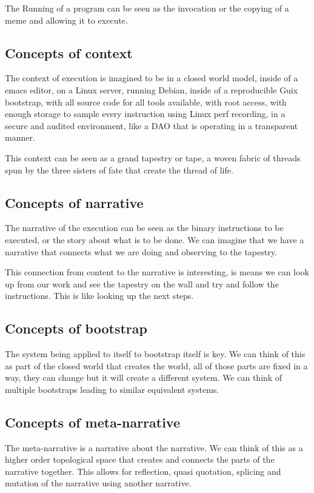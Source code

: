 \documentclass{article}
\begin{document}
The Running of a program can be seen as the invocation or the copying of a meme
and allowing it to execute.

\subsection{Concepts of context}
The context of execution is imagined to be in a closed world model,
inside of a emacs editor, on a Linux server, running Debian,
inside of a reproducible Guix bootstrap,
with all source code for all tools available,
with root access,
with enough storage to sample every instruction using Linux perf recording,
in a secure and audited environment, like a DAO that is operating in a transparent manner.

This context can be seen as a grand tapestry or tape, a woven fabric of threads
spun by the three sisters of fate that create the thread of life.

\subsection{Concepts of narrative}

The narrative of the execution can be seen as the binary instructions to be executed, or the story about what is to be done. We can imagine that
we have a narrative that connects what we are doing and observing
to the tapestry. 

This connection from content to the narrative is interesting,
is means we can look up from our work and see the tapestry on the wall and try and follow the instructions. This is like looking up the next steps.

\subsection{Concepts of bootstrap}

The system being applied to itself to bootstrap itself is key.
We can think of this as part of the closed world that creates the world,
all of those parts are fixed in a way, they can change but it will create a different system. We can think of multiple bootstraps leading to similar equivalent systems.

\subsection{Concepts of meta-narrative}

The meta-narrative is a narrative about the narrative. We can think of this as a higher order topological space that creates and connects the parts of the narrative together. This allows for reflection, quasi quotation, splicing and mutation of the narrative using another narrative. 
\end{document}
